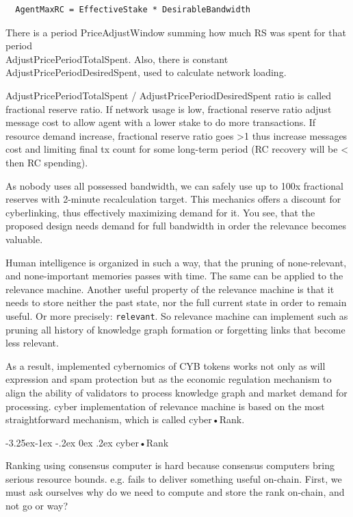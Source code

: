 \documentclass[8pt,oneside]{amsart}
\makeatletter
\newcommand{\linkgreen}[2]{\href{#1}{\color{green}{#2}}}
\renewcommand\subsection{\@startsection{subsection}{2}{\z@}%
                                     {-3.25ex\@plus -1ex \@minus -.2ex}%
                                     {0ex \@plus .2ex}%
                                     {\play\Large}}%
\newcommand{\titleSection}[1]{\subsection{#1}}
\newcommand{\code}[1]{{\PlayBold #1}}
\makeatother
\begin{document}
\begin{lstlisting}
  AgentMaxRC = EffectiveStake * DesirableBandwidth
\end{lstlisting}

There is a period \code{PriceAdjustWindow} summing how much RS was spent for that period\\ \code{AdjustPricePeriodTotalSpent}. Also, there is constant \code{AdjustPricePeriodDesiredSpent}, used to calculate network loading.

\code{AdjustPricePeriodTotalSpent / AdjustPricePeriodDesiredSpent} ratio is called fractional reserve ratio. If network usage is low, fractional reserve ratio adjust message cost to allow agent with a lower stake to do more transactions. If resource demand increase, fractional reserve ratio goes \code{>1} thus increase messages cost and limiting final tx count for some long-term period (RC recovery will be \code{<} then RC spending).

As nobody uses all possessed bandwidth, we can safely use up to 100x fractional reserves with 2-minute recalculation target. This mechanics offers a discount for cyberlinking, thus effectively maximizing demand for it. You see, that the proposed design needs demand for full bandwidth in order the relevance becomes valuable.

Human intelligence is organized in such a way, that the pruning of none-relevant, and none-important memories passes with time. The same can be applied to the relevance machine. Another useful property of the relevance machine is that it needs to store neither the past state, nor the full current state in order to remain useful. Or more precisely: \verb|relevant|. So relevance machine can implement \linkgreen{https://ipfs.io/ipfs/QmP81EcuNDZHQutvdcDjbQEqiTYUzU315aYaTyrVj6gtJb}{aggressive pruning strategies} such as pruning all history of knowledge graph formation or forgetting links that become less relevant.

As a result, implemented cybernomics of CYB tokens works not only as will expression and spam protection but as the economic regulation mechanism to align the ability of validators to process knowledge graph and market demand for processing. \code{cyber} implementation of relevance machine is based on the most straightforward mechanism, which is called cyber•Rank.

\titleSection{cyber•Rank}\label{cyberRank}

Ranking using consensus computer is hard because consensus computers bring serious resource bounds. e.g. \linkgreen{https://ipfs.io/ipfs/QmWTZjDZNbBqcJ5b6VhWGXBQ5EQavKKDteHsdoYqB5CBjh}{Nebulas} fails to deliver something useful on-chain. First, we must ask ourselves why do we need to compute and store the rank on-chain, and not go \linkgreen{https://ipfs.io/ipfs/QmZo7eY5UdJYotf3Z9GNVBGLjkCnE1j2fMdW2PgGCmvGPj}{Colony} or \linkgreen{https://ipfs.io/ipfs/QmTrxXp2xhB2zWGxhNoLgsztevqKLwpy5HwKjLjzFa7rnD}{Truebit} way?
\end{document}
